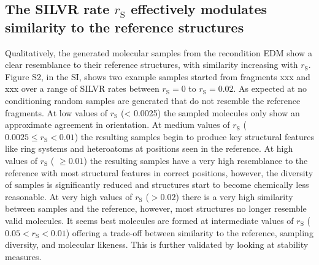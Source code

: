 \documentclass[journal=jacsat,manuscript=article]{achemso}
\begin{document}
\subsection{The SILVR rate $r_{\mathrm{S}}$ effectively modulates similarity to the reference structures}
Qualitatively, the generated molecular samples from the recondition EDM  show a clear resemblance to their reference structures, with similarity increasing with $r_{\mathrm{S}}$. Figure S2, in the SI, shows two example samples started from fragments xxx and xxx over a range of SILVR rates between $r_{\mathrm{S}}=0$ to $r_{\mathrm{S}}=0.02$. As expected at no conditioning random samples are generated that do not resemble the reference fragments.  At low values of $r_{\mathrm{S}}$ (< 0.0025) the sampled molecules only show an approximate agreement in orientation. At medium values of $r_{\mathrm{S}}$ ($0.0025 \le r_{\mathrm{S}} < 0.01$) the resulting samples begin to produce key structural features like ring systems and heteroatoms at positions seen in the reference. At high values of $r_{\mathrm{S}}$ ( $\ge 0.01$) the resulting samples have a very high resemblance to the reference with most structural features in correct positions, however, the diversity of samples is significantly reduced and structures start to become chemically less reasonable. At very high values of $r_{\mathrm{S}}$ ($> 0.02$) there is a very high similarity between samples and the reference, however, most structures no longer resemble valid molecules. It seems best molecules are formed at intermediate values of $r_{\mathrm{S}}$ ($0.05 < r_{\mathrm{S}} < 0.01$) offering a trade-off between similarity to the reference, sampling diversity, and molecular likeness. This is further validated by looking at stability measures. 
\end{document}
